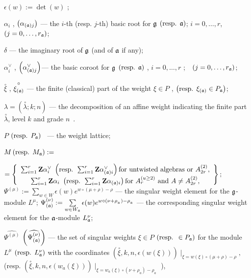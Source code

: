 \documentclass[a4paper,12pt]{article}
\theoremstyle{definition} \newtheorem{Def}{Definition}
\newcommand{\co}[1]{\overset{\circ }{#1}}
\begin{document}
$\epsilon \left( w\right) :=\det \left( w\right) $ ;

$\alpha _{i}$ , $\left( \alpha _{\left( \frak{a}\right) j}\right) $ --- the $i
$-th (resp. $j$-th) basic root for $\frak{g}$ $\left( \text{resp. }\frak{a}%
\right) $; $i=0,\ldots ,r$,\ \ $\left( j=0,\ldots ,r_{\frak{a}}\right) $;

$\delta $ --- the imaginary root of $\frak{g}$ (and of $\frak{a}$ if any);

$\alpha _{i}^{\vee }$ , $\left( \alpha _{\left( \frak{a}\right) j}^{\vee
}\right) $--- the basic coroot for $\frak{g}$ $\left( \text{resp. }\frak{a}%
\right) $ , $i=0,\ldots ,r$ ;\ \ $\left( j=0,\ldots ,r_{\frak{a}}\right) $;

$\co{\xi }$ , $\co{\xi _{\left( \frak{a}\right) }}$
--- the finite (classical) part of the weight $\xi \in P$ , $\left( \text{%
resp. }\xi _{\left( \frak{a}\right) }\in P_{\frak{a}}\right) $;

$\lambda =\left( \co{\lambda };k;n\right) $ --- the
decomposition of an affine weight indicating the finite part $\co{\lambda }$, level $k$ and grade $n$\ .

$P$ $\left( \text{resp. } P_{\frak{a}}\right) $ \ --- the weight lattice;

$M \left( \text{resp. }M_{\frak{a}}\right) :=$

\noindent $=\left\{
\begin{array}{c}
\sum_{i=1}^{r}\mathbf{Z}\alpha _{i}^{\vee }\text{ }\left( \text{resp. }%
\sum_{i=1}^{r}\mathbf{Z}\alpha _{\left( \frak{a}\right) i}^{\vee }\right)
\text{for untwisted algebras or }A_{2r}^{\left( 2\right) }, \\
\sum_{i=1}^{r}\mathbf{Z}\alpha _{i}\text{ }\left( \text{resp. }\sum_{i=1}^{r}%
\mathbf{Z}\alpha _{\left( \frak{a}\right) i}\right) \text{for }A_{r}^{\left(
u\geq 2\right) }\text{ and }A\neq A_{2r}^{\left( 2\right) },
\end{array}
\right\} ;$\\
$\Psi ^{\left( \mu \right) }:=\sum\limits_{w\in W}\epsilon (w)e^{w\circ (\mu +\rho )-\rho }$ --- the singular weight element for the $\frak{g}$-module $L^{\mu }$;
$\Psi _{\left( \frak{a}\right) }^{\left( \nu \right) }:=\sum\limits_{w\in W_{\frak{a}}}\epsilon (w)e^{w\circ (\nu +\rho
_{_{\frak{a}}})-\rho _{_{\frak{a}}}}$ --- the corresponding singular weight
element for the $\frak{a}$-module $L_{\frak{a}}^{\nu }$;

$\widehat{\Psi ^{\left( \mu \right) }}$ $\left( \widehat{\Psi _{\left( \frak{%
a}\right) }^{\left( \nu \right) }}\right) $ --- the set of singular weights $%
\xi \in P$ $\left( \text{resp. }\in P_{\frak{a}}\right) $ for the module $%
L^{\mu }$ $\left( \text{resp. }L_{\frak{a}}^{\nu }\right) $ with the
coordinates $\left( \co{\xi },k,n,\epsilon \left( w\left( \xi
\right) \right) \right) \mid _{\xi =w\left( \xi \right) \circ (\mu +\rho
)-\rho },$ (resp. $\left( \co{\xi },k,n,\epsilon \left(
w_{a}\left( \xi \right) \right) \right) \mid _{\xi =w_{a}\left( \xi \right)
\circ (\nu +\rho _{a})-\rho _{a}}$ ), 
\end{document}
